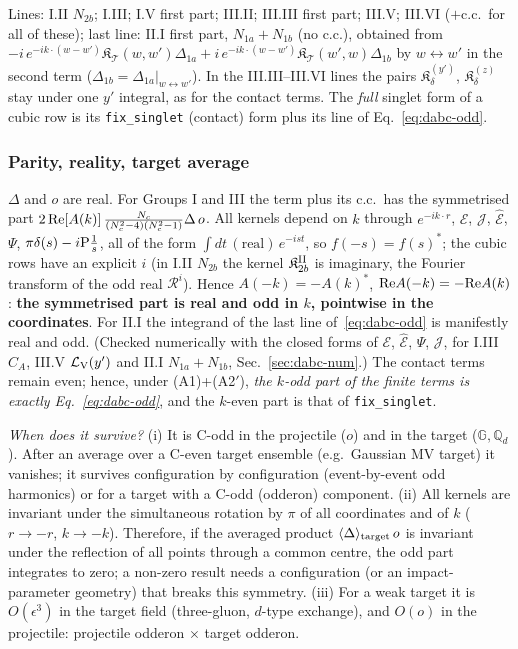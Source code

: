 \documentclass[10pt]{article}
\def\mf#1{\mathbb{#1}}
\begin{document}
Lines: I.II $N_{2b}$; I.III; I.V first part; III.II; III.III first part; III.V; III.VI ($+$c.c.\ for all of these); last line: II.I first part, $N_{1a}+N_{1b}$ (no c.c.), obtained from $-i\,e^{-ik\cdot(w-w')}\mathfrak{K}_{\mathcal{T}}(w,w')\Delta_{1a}+i\,e^{-ik\cdot(w-w')}\mathfrak{K}_{\mathcal{T}}(w',w)\Delta_{1b}$ by $w\leftrightarrow w'$ in the second term ($\Delta_{1b}=\Delta_{1a}|_{w\leftrightarrow w'}$). In the III.III--III.VI lines the pairs $\mathfrak{K}^{(y')}_{\delta}$, $\mathfrak{K}^{(z)}_{\delta}$ stay under one $y'$ integral, as for the contact terms. The \emph{full} singlet form of a cubic row is its \texttt{fix\_singlet} (contact) form plus its line of Eq.~\eqref{eq:dabc-odd}.

\subsubsection{Parity, reality, target average}\label{sec:dabc-parity}
\noindent $\Delta$ and $o$ are real. For Groups I and III the term plus its c.c.\ has the symmetrised part $2\,{\rm Re}[A(k)]\,\frac{N_{c}}{(N_{c}^{2}-4)(N_{c}^{2}-1)}\Delta\,o$. All kernels depend on $k$ through $e^{-ik\cdot r}$, $\mathcal{E}$, $\mathcal{J}$, $\widehat{\mathcal{E}}$, $\Psi$, $\pi\delta(s)-i{\rm P}\frac1s$, all of the form $\int dt\,(\text{real})\,e^{-ist}$, so $f(-s)=f(s)^{*}$; the cubic rows have an explicit $i$ (in I.II $N_{2b}$ the kernel $\mathfrak{K}^{\rm II}_{2b}$ is imaginary, the Fourier transform of the odd real $\mathcal{R}^{i}$). Hence $A(-k)=-A(k)^{*}$, ${\rm Re}A(-k)=-{\rm Re}A(k)$: \textbf{the symmetrised part is real and odd in $k$, pointwise in the coordinates}. For II.I the integrand of the last line of~\eqref{eq:dabc-odd} is manifestly real and odd. (Checked numerically with the closed forms of $\mathcal{E}$, $\widehat{\mathcal{E}}$, $\Psi$, $\mathcal{J}$, for I.III $C_{A}$, III.V $\mathcal{L}_{\rm V}(y')$ and II.I $N_{1a}+N_{1b}$, Sec.~\ref{sec:dabc-num}.) The contact terms remain even; hence, under (A1)+(A2$'$), \emph{the $k$-odd part of the finite terms is exactly Eq.~\eqref{eq:dabc-odd}}, and the $k$-even part is that of \texttt{fix\_singlet}.\par
\noindent\emph{When does it survive?} (i) It is C-odd in the projectile ($o$) and in the target ($\mf{G},\mf{Q}_{d}$). After an average over a C-even target ensemble (e.g.\ Gaussian MV target) it vanishes; it survives configuration by configuration (event-by-event odd harmonics) or for a target with a C-odd (odderon) component. (ii) All kernels are invariant under the simultaneous rotation by $\pi$ of all coordinates and of $k$ ($r\to-r$, $k\to-k$). Therefore, if the averaged product $\langle\Delta\rangle_{\rm target}\,o$ is invariant under the reflection of all points through a common centre, the odd part integrates to zero; a non-zero result needs a configuration (or an impact-parameter geometry) that breaks this symmetry. (iii) For a weak target it is $O(\epsilon^{3})$ in the target field (three-gluon, $d$-type exchange), and $O(o)$ in the projectile: projectile odderon $\times$ target odderon.
\end{document}
